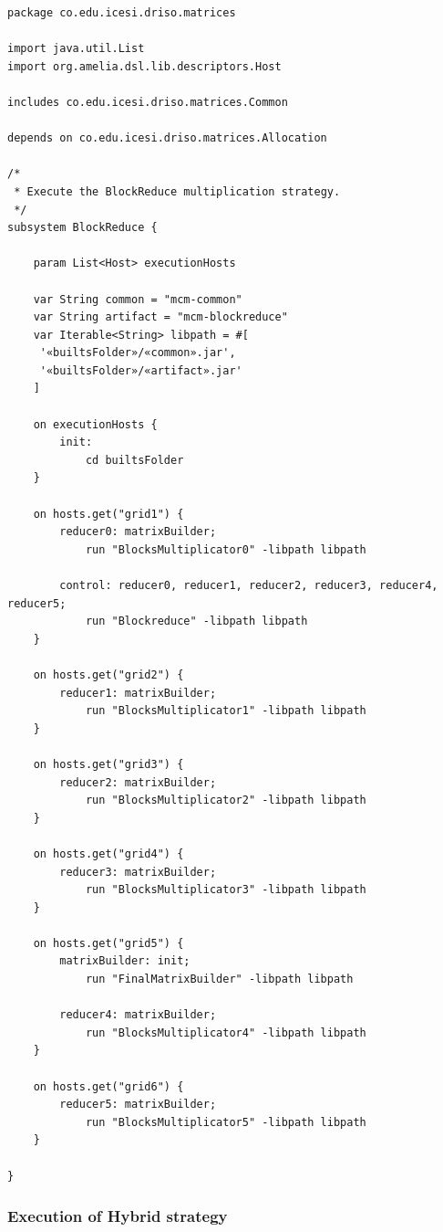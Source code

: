 \documentclass{article}
\begin{document}
\begin{lstlisting}[style=amelia,caption=Subsystem for executing BlockReduce strategy.]
package co.edu.icesi.driso.matrices

import java.util.List
import org.amelia.dsl.lib.descriptors.Host

includes co.edu.icesi.driso.matrices.Common

depends on co.edu.icesi.driso.matrices.Allocation

/*
 * Execute the BlockReduce multiplication strategy.
 */
subsystem BlockReduce {
	
	param List<Host> executionHosts
	
	var String common = "mcm-common"
	var String artifact = "mcm-blockreduce"
	var Iterable<String> libpath = #[
	 '«builtsFolder»/«common».jar',
	 '«builtsFolder»/«artifact».jar'
	]
	
	on executionHosts {
		init:
            cd builtsFolder
	}
	
	on hosts.get("grid1") {
		reducer0: matrixBuilder;
			run "BlocksMultiplicator0" -libpath libpath

		control: reducer0, reducer1, reducer2, reducer3, reducer4, reducer5;
			run "Blockreduce" -libpath libpath
	}
	
	on hosts.get("grid2") {
		reducer1: matrixBuilder;
			run "BlocksMultiplicator1" -libpath libpath
	}
	
	on hosts.get("grid3") {
		reducer2: matrixBuilder;
			run "BlocksMultiplicator2" -libpath libpath
	}
	
	on hosts.get("grid4") {
		reducer3: matrixBuilder;
			run "BlocksMultiplicator3" -libpath libpath
	}
	
	on hosts.get("grid5") {
		matrixBuilder: init;
			run "FinalMatrixBuilder" -libpath libpath
	
		reducer4: matrixBuilder;
			run "BlocksMultiplicator4" -libpath libpath
	}
	
	on hosts.get("grid6") {	
		reducer5: matrixBuilder;
			run "BlocksMultiplicator5" -libpath libpath
	}

}
\end{lstlisting}

\subsubsection{Execution of Hybrid strategy}
\end{document}
